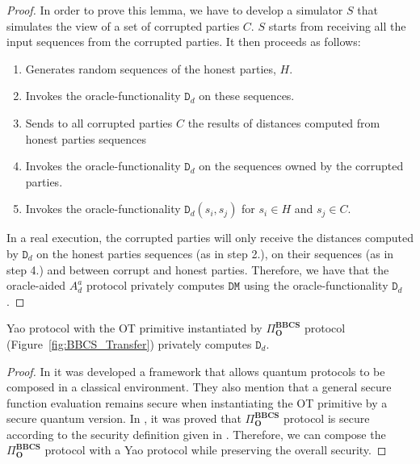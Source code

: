 \begin{proof}
In order to prove this lemma, we have to develop a simulator $S$ that simulates the view of a set of corrupted parties $C$. $S$ starts from receiving all the input sequences from the corrupted parties. It then proceeds as follows:

\begin{enumerate}
    \item Generates random sequences of the honest parties, $H$.
    \item Invokes the oracle-functionality $\mathtt{D}_d$ on these sequences.
    \item Sends to all corrupted parties $C$ the results of distances computed from honest parties sequences
    \item Invokes the oracle-functionality $\mathtt{D}_d$ on the sequences owned by the corrupted parties.
    \item Invokes the oracle-functionality $\mathtt{D}_d(s_i, s_j)$ for $s_i\in H$ and $s_j\in C$. 
\end{enumerate}

In a real execution, the corrupted parties will only receive the distances computed by $\mathtt{D}_d$ on the honest parties sequences (as in step 2.), on their sequences (as in step 4.) and between corrupt and honest parties. Therefore, we have that the oracle-aided $A^a_d$ protocol privately computes $\mathtt{DM}$ using the oracle-functionality $\mathtt{D}_d$.

\end{proof}

\begin{lemma}\label{secondlemma}
Yao protocol with the OT primitive instantiated by $\Pi^{\textbf{BBCS}}_{\textbf{O}}$ protocol (Figure~\ref{fig:BBCS_Transfer}) privately computes $\mathtt{D}_d$.
\end{lemma}

\begin{proof}

In \cite{FS09} it was developed a framework that allows quantum protocols to be composed in a classical environment. They also mention that a general secure function evaluation remains secure when instantiating the OT primitive by a secure quantum version. In \cite{DFL+09}, it was proved that $\Pi^{\textbf{BBCS}}_{\textbf{O}}$ protocol is secure according to the security definition given in \cite{FS09}. Therefore, we can compose the $\Pi^{\textbf{BBCS}}_{\textbf{O}}$ protocol with a Yao protocol \cite{Lindell2008} while preserving the overall security. 

\end{proof}

